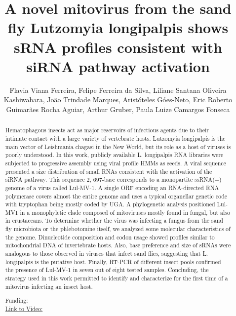 \documentclass[twoside]{article}
\title{\vspace{-15mm}\fontsize{24pt}{10pt}\selectfont\textbf{ A novel mitovirus from the sand fly Lutzomyia longipalpis shows sRNA profiles consistent with siRNA pathway activation }} %
\author{ Flavia Viana Ferreira,  Felipe Ferreira da Silva,  Liliane Santana Oliveira Kashiwabara,  Jo\~ao Trindade Marques,  Arist\'oteles G\'oes-Neto,  Eric Roberto Guimar\~aes Rocha Aguiar,  Arthur Gruber,  Paula Luize Camargos Fonseca }
\affil{ UNIVERSIDADE TECNOL\'OGICA FEDERAL DO PARAN\'A,  UNIVERSIDADE FEDERAL DE MINAS GERAIS,  UNIVERSIDADE DE S\~AO PAULO,  UNIVERSIDADE ESTADUAL DE SANTA CRUZ }
\date{}
\begin{document}
  
  
  \maketitle %
  
  
  \thispagestyle{fancy} %
  
  
  \begin{abstract}
  Hematophagous insects act as major reservoirs of infectious agents due to their intimate contact with a large variety of vertebrate hosts. Lutzomyia longipalpis is the main vector of Leishmania chagasi in the New World,  but its role as a host of viruses is poorly understood. In this work,  publicly available L. longipalpis RNA libraries were subjected to progressive assembly using viral profile HMMs as seeds. A viral sequence presented a size distribution of small RNAs consistent with the activation of the siRNA pathway. This sequence 2, 697-base corresponds to a monopartite ssRNA(+) genome of a virus called Lul-MV-1. A single ORF encoding an RNA-directed RNA polymerase covers almost the entire genome and uses a typical organellar genetic code with tryptophan being mostly coded by UGA. A phylogenetic analysis positioned Lul-MV1 in a monophyletic clade composed of mitoviruses mostly found in fungal,  but also in crustaceans. To determine whether the virus was infecting a fungus from the sand fly microbiota or the phlebotomine itself,  we analyzed some molecular characteristics of the genome. Dinucleotide composition and codon usage showed profiles similar to mitochondrial DNA of invertebrate hosts. Also,  base preference and size of sRNAs were analogous to those observed in viruses that infect sand flies,  suggesting that L. longipalpis is the putative host. Finally,  RT-PCR of different insect pools confirmed the presence of Lul-MV-1 in seven out of eight tested samples. Concluding,  the strategy used in this work permitted to identify and characterize for the first time of a mitovirus infecting an insect host.
  
  Funding:   \\
  \href{http://ab3c.org.br/xpress_pres2020/xmxp2020-305587.html}{Link to Video:}

  \end{abstract}
   
  
\end{document}
